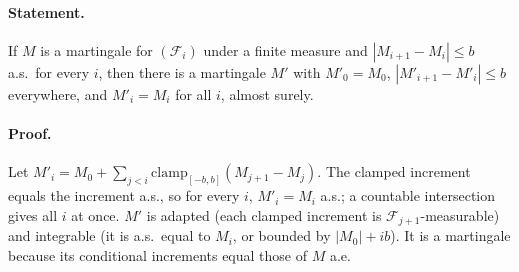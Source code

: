 \paragraph{Statement.} If $M$ is a martingale for $(\mathcal F_i)$ under a finite measure and
$|M_{i+1}-M_i|\leq b$ a.s.\ for every $i$, then there is a martingale $M'$ with $M'_0=M_0$,
$|M'_{i+1}-M'_i|\leq b$ everywhere, and $M'_i=M_i$ for all $i$, almost surely.
\paragraph{Proof.} Let $M'_i=M_0+\sum_{j<i}\mathrm{clamp}_{[-b,b]}(M_{j+1}-M_j)$. The clamped increment equals the
increment a.s., so for every $i$, $M'_i=M_i$ a.s.; a countable intersection gives all $i$ at once. $M'$ is
adapted (each clamped increment is $\mathcal F_{j+1}$-measurable) and integrable (it is a.s.\ equal to
$M_i$, or bounded by $|M_0|+ib$). It is a martingale because its conditional increments equal those of $M$
a.e.
